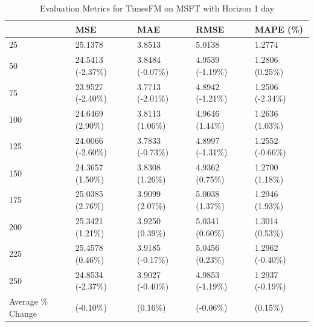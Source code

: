 \begin{table}
\caption{Evaluation Metrics for TimesFM on MSFT with Horizon 1 day}
\label{tab:fm_MSFT_h1_metrics}
\begin{tabular}{lllll}
\toprule
 & MSE & MAE & RMSE & MAPE (\%) \\
\midrule
25 & 25.1378 & 3.8513 & 5.0138 & 1.2774 \\
50 & 24.5413 (-2.37\%) & 3.8484 (-0.07\%) & 4.9539 (-1.19\%) & 1.2806 (0.25\%) \\
75 & 23.9527 (-2.40\%) & 3.7713 (-2.01\%) & 4.8942 (-1.21\%) & 1.2506 (-2.34\%) \\
100 & 24.6469 (2.90\%) & 3.8113 (1.06\%) & 4.9646 (1.44\%) & 1.2636 (1.03\%) \\
125 & 24.0066 (-2.60\%) & 3.7833 (-0.73\%) & 4.8997 (-1.31\%) & 1.2552 (-0.66\%) \\
150 & 24.3657 (1.50\%) & 3.8308 (1.26\%) & 4.9362 (0.75\%) & 1.2700 (1.18\%) \\
175 & 25.0385 (2.76\%) & 3.9099 (2.07\%) & 5.0038 (1.37\%) & 1.2946 (1.93\%) \\
200 & 25.3421 (1.21\%) & 3.9250 (0.39\%) & 5.0341 (0.60\%) & 1.3014 (0.53\%) \\
225 & 25.4578 (0.46\%) & 3.9185 (-0.17\%) & 5.0456 (0.23\%) & 1.2962 (-0.40\%) \\
250 & 24.8534 (-2.37\%) & 3.9027 (-0.40\%) & 4.9853 (-1.19\%) & 1.2937 (-0.19\%) \\
Average \% Change & (-0.10\%) & (0.16\%) & (-0.06\%) & (0.15\%) \\
\bottomrule
\end{tabular}
\end{table}
